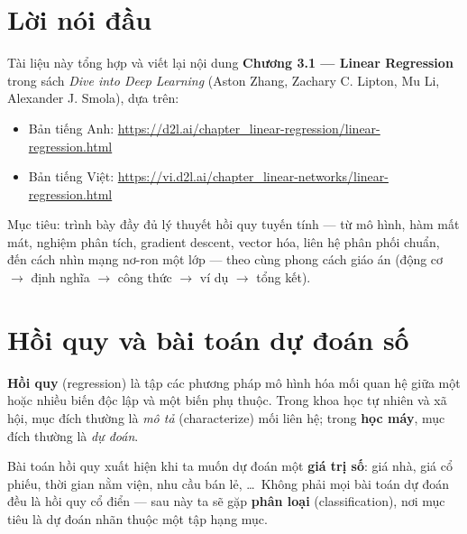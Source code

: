 \documentclass[12pt,a4paper]{article}
\begin{document}

\newpage
\tableofcontents
\newpage

\section*{Lời nói đầu}

Tài liệu này tổng hợp và viết lại nội dung \textbf{Chương 3.1 --- Linear Regression} trong sách \emph{Dive into Deep Learning} (Aston Zhang, Zachary C. Lipton, Mu Li, Alexander J. Smola), dựa trên:
\begin{itemize}
  \item Bản tiếng Anh: \url{https://d2l.ai/chapter\_linear-regression/linear-regression.html}
  \item Bản tiếng Việt: \url{https://vi.d2l.ai/chapter\_linear-networks/linear-regression.html}
\end{itemize}

Mục tiêu: trình bày đầy đủ lý thuyết hồi quy tuyến tính --- từ mô hình, hàm mất mát, nghiệm phân tích, gradient descent, vector hóa, liên hệ phân phối chuẩn, đến cách nhìn mạng nơ-ron một lớp --- theo cùng phong cách giáo án (động cơ $\to$ định nghĩa $\to$ công thức $\to$ ví dụ $\to$ tổng kết).

\newpage

\section{Hồi quy và bài toán dự đoán số}

\begin{dongco}[title={Động cơ --- Khi nào cần hồi quy?}]
\textbf{Hồi quy} (regression) là tập các phương pháp mô hình hóa mối quan hệ giữa một hoặc nhiều biến độc lập và một biến phụ thuộc. Trong khoa học tự nhiên và xã hội, mục đích thường là \emph{mô tả} (characterize) mối liên hệ; trong \textbf{học máy}, mục đích thường là \emph{dự đoán}.

Bài toán hồi quy xuất hiện khi ta muốn dự đoán một \textbf{giá trị số}: giá nhà, giá cổ phiếu, thời gian nằm viện, nhu cầu bán lẻ, \ldots\ Không phải mọi bài toán dự đoán đều là hồi quy cổ điển --- sau này ta sẽ gặp \textbf{phân loại} (classification), nơi mục tiêu là dự đoán nhãn thuộc một tập hạng mục.
\end{dongco}
\end{document}
